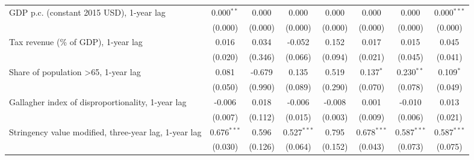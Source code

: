 \begin{table}[htbp]
\begin{tabular}{lccccccc}
      GDP p.c. (constant 2015 USD), 1-year lag                                                  & 0.000$^{**}$  & 0.000                     & 0.000          & 0.000            & 0.000           & 0.000           & 0.000$^{***}$\\   
                                                                                                & (0.000)       & (0.000)                   & (0.000)        & (0.000)          & (0.000)         & (0.000)         & (0.000)\\   
      Tax revenue (\% of GDP), 1-year lag                                                       & 0.016         & 0.034                     & -0.052         & 0.152            & 0.017           & 0.015           & 0.045\\   
                                                                                                & (0.020)       & (0.346)                   & (0.066)        & (0.094)          & (0.021)         & (0.045)         & (0.041)\\   
      Share of population >65, 1-year lag                                                       & 0.081         & -0.679                    & 0.135          & 0.519            & 0.137$^{*}$     & 0.230$^{**}$    & 0.109$^{*}$\\   
                                                                                                & (0.050)       & (0.990)                   & (0.089)        & (0.290)          & (0.070)         & (0.078)         & (0.049)\\   
      Gallagher index of disproportionality, 1-year lag                                         & -0.006        & 0.018                     & -0.006         & -0.008           & 0.001           & -0.010          & 0.013\\   
                                                                                                & (0.007)       & (0.112)                   & (0.015)        & (0.003)          & (0.009)         & (0.006)         & (0.021)\\   
      Stringency value modified, three-year lag, 1-year lag                                     & 0.676$^{***}$ & 0.596                     & 0.527$^{***}$  & 0.795            & 0.678$^{***}$   & 0.587$^{***}$   & 0.587$^{***}$\\   
                                                                                                & (0.030)       & (0.126)                   & (0.064)        & (0.152)          & (0.043)         & (0.073)         & (0.075)\\   

\end{tabular}
\end{table}
